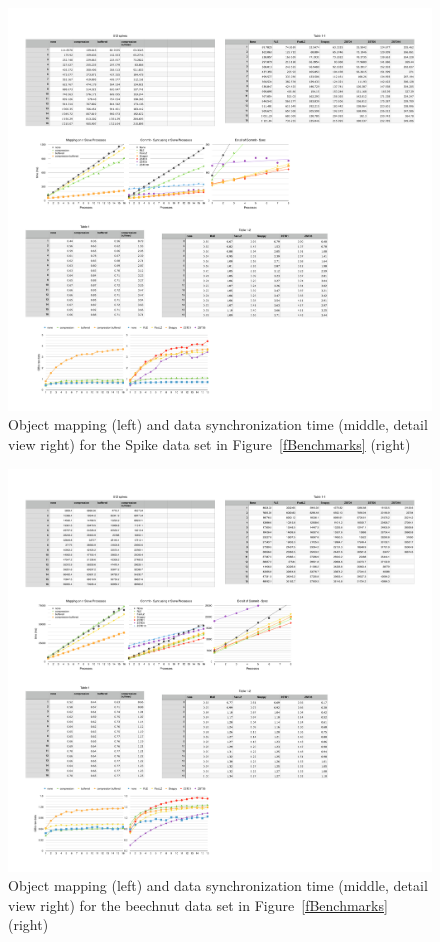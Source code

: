 \documentclass[10pt,journal,compsoc]{IEEEtran}
\newcommand{\fig}[1]{Figure~\ref{#1}}
\begin{document}
\begin{figure}[p!]\center
  \includegraphics[height=.19\textheight]{images/spikesdist}
  \caption{\label{fSpikesDist}Object mapping (left) and data synchronization
    time (middle, detail view right) for the Spike data set in
    \fig{fBenchmarks} (right)}
\end{figure}
\begin{figure}[p!]\center
  \includegraphics[height=.19\textheight]{images/beechnutdist}
  \caption{\label{fBeechnutDist}Object mapping (left) and data synchronization
    time (middle, detail view right) for the beechnut data set in
    \fig{fBenchmarks} (right)}
\end{figure}
\end{document}
